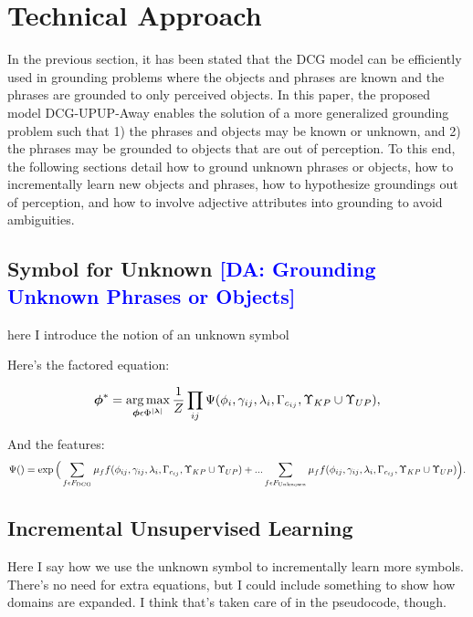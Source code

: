 \section{Technical Approach} \label{sec:technical}
In the previous section, it has been stated that the DCG model can be efficiently used in grounding problems where the objects and phrases are known and the phrases are grounded to only perceived objects. In this paper, the proposed model DCG-UPUP-Away enables the solution of a more generalized grounding problem such that 1) the phrases and objects may be known or unknown, and 2) the phrases may be grounded to objects that are out of perception. To this end, the following sections detail how to ground unknown phrases or objects, how to incrementally learn new objects and phrases, how to hypothesize groundings out of perception, and how to involve adjective attributes into grounding to avoid ambiguities.   

\subsection{Symbol for Unknown \textcolor{blue}{[DA: Grounding Unknown Phrases or Objects]}}
here I introduce the notion of an unknown symbol

Here's the factored equation:

\begin{equation}
\boldsymbol{\phi}^* = \operatorname*{\arg\max}_{\boldsymbol{\phi} \epsilon \Phi^{|\boldsymbol{\lambda}|}} \frac{1}{Z} \prod_{ij} \Psi(\phi_i,\gamma_{ij},\lambda_i,\Gamma_{c_{ij}},\Upsilon_{KP} \cup \Upsilon_{UP}),
\label{eq:dcg_upup_llm1}
\end{equation}

And the features:
\begin{equation}
\Psi() = \exp \Big( \sum_{f \epsilon F_{\text{DCG}}} \mu_f f(\phi_{ij},\gamma_{ij},\lambda_i,\Gamma_{c_{ij}},\Upsilon_{KP} \cup \Upsilon_{UP}) +...\\
\sum_{f \epsilon F_{\text{Unknown}}} \mu_f f(\phi_{ij},\gamma_{ij},\lambda_i,\Gamma_{c_{ij}},\Upsilon_{KP} \cup \Upsilon_{UP}) \Big)
\label{eq:dcg_upup_llm2}.
\end{equation}
\subsection{Incremental Unsupervised Learning}
Here I say how we use the unknown symbol to incrementally learn more symbols.
There's no need for extra equations, but I could include something to show how domains are expanded.
I think that's taken care of in the pseudocode, though.

